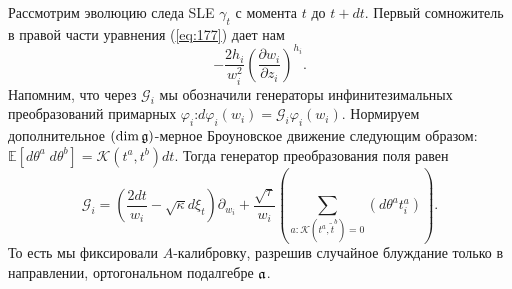 Рассмотрим эволюцию следа SLE $\gamma_{t}$ с момента   $t$ до $t+ dt$.  Первый сомножитель в правой части уравнения (\ref{eq:177}) дает нам
\begin{equation*}
  -\frac{2h_{i}}{w_{i}^{2}}\left(\frac{\partial w_{i}}{\partial z_{i}}\right)^{h_{i}}.
\end{equation*}
Напомним, что через  $\mathcal{G}_{i}$ мы обозначили  генераторы инфинитезимальных преобразований примарных $\varphi_{i}$:$d\varphi_{i}(w_{i}) = \mathcal{G}_{i}\varphi_{i}(w_{i})$. Нормируем дополнительное $\left(\dim\mathfrak{g}\right)$-мерное Броуновское движение следующим образом: $\mathbb  {E}\left[d\theta^{a}\; d\theta^{b}\right]=\mathcal{K}(t^{a},t^{b})dt$. Тогда генератор преобразования поля равен
\begin{equation}
  \mathcal{G}_{i}=\left(\frac{2dt}{w_{i}}-\sqrt{\kappa} d\xi_{t}\right) \partial_{w_{i}}+\frac{\sqrt{\tau}}{w_{i}}\left(\sum_{a:\mathcal{K}(t^{a},\tilde{t}^{b})=0}\left(d \theta ^{a} t^{a}_{i}\right)\right).
\label{eq:179}
\end{equation}
То есть мы фиксировали  $A$-калибровку, разрешив случайное блуждание только в направлении, ортогональном подалгебре $\mathfrak{a}$. 

